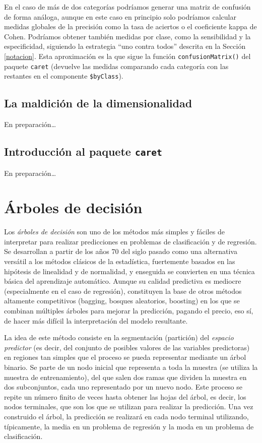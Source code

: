 \documentclass[]{book}
\theoremstyle{break}
\theoremstyle{definition}
\theoremstyle{definition}
\theoremstyle{definition}
\theoremstyle{remark}
\begin{document}
En el caso de más de dos categorías podríamos generar una matriz de
confusión de forma análoga, aunque en este caso en principio solo
podríamos calcular medidas globales de la precisión como la tasa de
aciertos o el coeficiente kappa de Cohen. Podríamos obtener también
medidas por clase, como la sensibilidad y la especificidad, siguiendo la
estrategia ``uno contra todos'' descrita en la Sección \ref{notacion}.
Esta aproximación es la que sigue la función \texttt{confusionMatrix()}
del paquete \texttt{caret} (devuelve las medidas comparando cada
categoría con las restantes en el componente \texttt{\$byClass}).

\section{La maldición de la
dimensionalidad}\label{la-maldiciuxf3n-de-la-dimensionalidad}

En preparación\ldots{}

\section{\texorpdfstring{Introducción al paquete
\texttt{caret}}{Introducción al paquete caret}}\label{caret}

En preparación\ldots{}

\chapter{Árboles de decisión}\label{trees}

Los \emph{árboles de decisión} son uno de los métodos más simples y
fáciles de interpretar para realizar predicciones en problemas de
clasificación y de regresión. Se desarrollan a partir de los años 70 del
siglo pasado como una alternativa versátil a los métodos clásicos de la
estadística, fuertemente basados en las hipótesis de linealidad y de
normalidad, y enseguida se convierten en una técnica básica del
aprendizaje automático. Aunque su calidad predictiva es mediocre
(especialmente en el caso de regresión), constituyen la base de otros
métodos altamente competitivos (bagging, bosques aleatorios, boosting)
en los que se combinan múltiples árboles para mejorar la predicción,
pagando el precio, eso sí, de hacer más difícil la interpretación del
modelo resultante.

La idea de este método consiste en la segmentación (partición) del
\emph{espacio predictor} (es decir, del conjunto de posibles valores de
las variables predictoras) en regiones tan simples que el proceso se
pueda representar mediante un árbol binario. Se parte de un nodo inicial
que representa a toda la muestra (se utiliza la muestra de
entrenamiento), del que salen dos ramas que dividen la muestra en dos
subconjuntos, cada uno representado por un nuevo nodo. Este proceso se
repite un número finito de veces hasta obtener las hojas del árbol, es
decir, los nodos terminales, que son los que se utilizan para realizar
la predicción. Una vez construido el árbol, la predicción se realizará
en cada nodo terminal utilizando, típicamente, la media en un problema
de regresión y la moda en un problema de clasificación.
\end{document}
